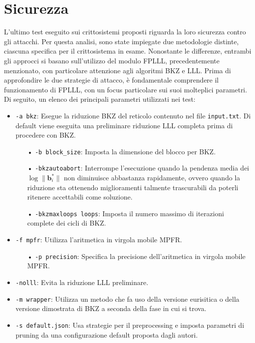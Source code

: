 \section{Sicurezza}
\label{sec:risultati_sicurezza}
L'ultimo test eseguito sui crittosistemi proposti riguarda la loro sicurezza contro gli 
attacchi. Per questa analisi, sono state impiegate due metodologie distinte, 
ciascuna specifica per il crittosistema in esame. Nonostante le differenze, entrambi 
gli approcci si basano sull'utilizzo del modulo FPLLL, precedentemente menzionato, 
con particolare attenzione agli algoritmi BKZ e LLL. 
Prima di approfondire le due strategie di attacco, è fondamentale comprendere il 
funzionamento di FPLLL, con un focus particolare sui suoi molteplici parametri. 
Di seguito, un elenco dei principali parametri utilizzati nei test:
\begin{itemize}
    \item \texttt{-a bkz}: Esegue la riduzione BKZ del reticolo contenuto nel file 
    \texttt{input.txt}. Di default viene eseguita una preliminare riduzione LLL completa 
    prima di procedere con BKZ. 
    \begin{itemize}
        \item[•] \texttt{-b block\_size}: Imposta la dimensione del blocco per BKZ.
        \item[•] \texttt{-bkzautoabort}: Interrompe l'esecuzione quando la pendenza media dei 
        $\log \|\mathbf{b}_i^*\|$ non diminuisce abbastanza rapidamente, ovvero quando la 
        riduzione sta ottenendo miglioramenti talmente trascurabili da poterli ritenere
        accettabili come soluzione. 
        \item[•] \texttt{-bkzmaxloops loops}: Imposta il numero massimo di iterazioni 
        complete dei cicli di BKZ.
    \end{itemize}
    \item \texttt{-f mpfr}: Utilizza l'aritmetica in virgola mobile MPFR.
    \begin{itemize}
        \item[•] \texttt{-p precision}: Specifica la precisione dell'aritmetica in 
        virgola mobile MPFR.
    \end{itemize}
    \item \texttt{-nolll}: Evita la riduzione LLL preliminare.
    \item \texttt{-m wrapper}: Utilizza un metodo che fa uso della versione eurisitica o 
    della versione dimostrata di BKZ a seconda della fase in cui si trova. 
    \item \texttt{-s default.json}: Usa strategie per il preprocessing e imposta 
    parametri di pruning da una configurazione default proposta dagli autori. 
\end{itemize}
